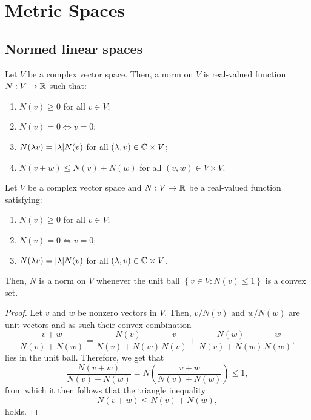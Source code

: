 \chapter{Metric Spaces}\label{chp:metric-spaces}

\section{Normed linear spaces}

\begin{definition}\label{def:normed-linear-spaces}
  Let \(V\) be a complex vector space. Then, a norm on \(V\) is real-valued
  function \(N:V\to\mathbb{R}\) such that:
  \begin{enumerate}
    \item
      \(N(v)\geqslant{0}\) for all \(v\in{V}\);
    \item
      \(N(v)=0\iff{v=0}\);
    \item
      \(N(\lambda{v})=\lvert\lambda\rvert N(v)\) for all
      \((\lambda,v)\in\mathbb{C}\times{V}\);
    \item
      \(N(v+w)\leqslant{N(v)+N(w)}\) for all \((v,w)\in{V\times{V}}\).
  \end{enumerate}
\end{definition}

\begin{lemma}
  Let \(V\) be a complex vector space and \(N:V\to\mathbb{R}\) be a real-valued
  function satisfying:
  \begin{enumerate}
    \item
      \(N(v)\geqslant{0}\) for all \(v\in{V}\);
    \item
      \(N(v)=0\iff{v=0}\);
    \item
      \(N(\lambda{v})=\lvert\lambda\rvert N(v)\) for all
      \((\lambda,v)\in\mathbb{C}\times{V}\).
  \end{enumerate}
  Then, \(N\) is a norm on \(V\) whenever the unit ball
  \(\left\{v\in{V}:N(v)\leqslant{1}\right\}\) is a convex set.
\end{lemma}

\begin{proof}
  Let \(v\) and \(w\) be nonzero vectors in \(V\). Then, \(v/N(v)\) and
  \(w/N(w)\) are unit vectors and as such their convex combination
  \[
    \frac{v+w}{N(v)+N(w)}
    =
    \frac{N(v)}{N(v)+N(w)}\frac{v}{N(v)}
    +
    \frac{N(w)}{N(v)+N(w)}\frac{w}{N(w)}
    ,
  \]
  lies in the unit ball. Therefore, we get that
  \[
    \frac{N(v+w)}{N(v)+N(w)}
    =
    N\left(\frac{v+w}{N(v)+N(w)}\right)\leqslant{1},
  \]
  from which it then follows that the triangle inequality
  \[
    N(v+w)\leqslant{N(v)+N(w)},
  \]
  holds.
\end{proof}

